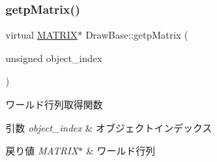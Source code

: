 \mbox{\label{class_draw_base_a60fc3148b2679e4ea7723d2af0c37283}} 
\subsubsection{\texorpdfstring{getp\+Matrix()}{getpMatrix()}}
{\footnotesize\ttfamily virtual \mbox{\hyperlink{_matrix_8h_a032295cd9fb1b711757c90667278e744}{M\+A\+T\+R\+IX}}$\ast$ Draw\+Base\+::getp\+Matrix (\begin{DoxyParamCaption}\item[{unsigned}]{object\+\_\+index }\end{DoxyParamCaption})\hspace{0.3cm}{\ttfamily [pure virtual]}}



ワールド行列取得関数 


\begin{DoxyParams}{引数}
{\em object\+\_\+index} & オブジェクトインデックス \\
\hline
\end{DoxyParams}

\begin{DoxyRetVals}{戻り値}
{\em M\+A\+T\+R\+I\+X$\ast$} & ワールド行列 \\
\hline
\end{DoxyRetVals}


